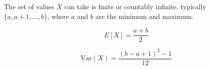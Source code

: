 \documentclass{article}
\begin{document}
The set of values \( X \) can take is finite or countably infinite, typically \(\{a, a+1, \ldots, b\}\), where \( a \) and \( b \) are the minimum and maximum.

\[
E[X] = \frac{a + b}{2}
\]

\[
\text{Var}(X) = \frac{(b - a + 1)^2 - 1}{12}
\]
\end{document}
